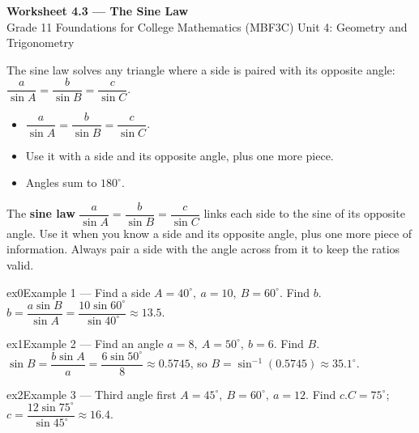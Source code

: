 \documentclass[11pt]{article}
\begin{document}
\begin{center}
{\LARGE\bfseries\color{titleblue}Worksheet 4.3 --- The Sine Law}\\[2pt]
{\small Grade 11 Foundations for College Mathematics (MBF3C) \textperiodcentered{} Unit 4: Geometry and Trigonometry}
\end{center}

\begin{ideabox}
The sine law solves any triangle where a side is paired with its opposite angle: $\dfrac{a}{\sin A}=\dfrac{b}{\sin B}=\dfrac{c}{\sin C}$.
\begin{itemize}[leftmargin=*,itemsep=2pt]
  \item $\dfrac{a}{\sin A}=\dfrac{b}{\sin B}=\dfrac{c}{\sin C}$.
  \item Use it with a side and its opposite angle, plus one more piece.
  \item Angles sum to $180^\circ$.
\end{itemize}
\end{ideabox}

\begin{learnbox}
The \textbf{sine law} $\dfrac{a}{\sin A}=\dfrac{b}{\sin B}=\dfrac{c}{\sin C}$ links each side to the sine of its opposite angle.
Use it when you know a side and its opposite angle, plus one more piece of information.
Always pair a side with the angle across from it to keep the ratios valid.
\end{learnbox}


\begin{example}{ex0}{Example 1 --- Find a side}
$A=40^\circ,\ a=10,\ B=60^\circ$. Find $b$.\soln $b=\dfrac{a\sin B}{\sin A}=\dfrac{10\sin60^\circ}{\sin40^\circ}\approx13.5$.
\end{example}

\begin{example}{ex1}{Example 2 --- Find an angle}
$a=8,\ A=50^\circ,\ b=6$. Find $B$.\soln $\sin B=\dfrac{b\sin A}{a}=\dfrac{6\sin50^\circ}{8}\approx0.5745$, so $B=\sin^{-1}(0.5745)\approx35.1^\circ$.
\end{example}

\begin{example}{ex2}{Example 3 --- Third angle first}
$A=45^\circ,\ B=60^\circ,\ a=12$. Find $c$.\soln $C=75^\circ$; $c=\dfrac{12\sin75^\circ}{\sin45^\circ}\approx16.4$.
\end{example}
\end{document}
